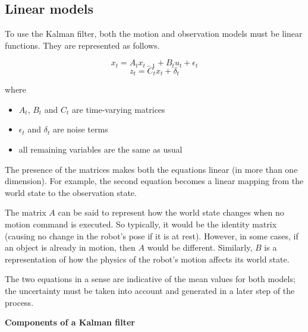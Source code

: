 \documentclass[a4paper]{article}
\begin{document}
\subsection{Linear models}

To use the Kalman filter, both the motion and observation models must be linear functions. They are represented as follows.

\begin{equation*}
    x_t = A_t x_{t-1} + B_t u_t + \epsilon_t
\end{equation*}
\begin{equation*}
    z_t = C_t x_t + \delta_t
\end{equation*}

where
\begin{itemize}
    \item $A_t$, $B_t$ and $C_t$ are time-varying matrices
    \item $\epsilon_t$ and $\delta_t$ are noise terms
    \item all remaining variables are the same as usual
\end{itemize}

The presence of the matrices makes both the equations linear (in more than one dimension). For example, the second equation becomes a linear mapping from the world state to the observation state.

The matrix $A$ can be said to represent how the world state changes when no motion command is executed. So typically, it would be the identity matrix (causing no change in the robot's pose if it is at rest). However, in some cases, if an object is already in motion, then $A$ would be different. Similarly, $B$ is a representation of how the physics of the robot's motion affects its world state.

The two equations in a sense are indicative of the mean values for both models; the uncertainty must be taken into account and generated in a later step of the process.

\textbf{Components of a Kalman filter}
\end{document}
